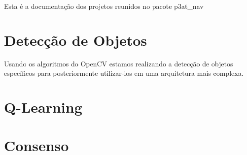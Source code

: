 \documentclass[a4paper, 12pt]{article}
\begin{document}
	Esta é a documentação dos projetos reunidos no pacote p3at\_nav

	\section{Detecção de Objetos}
		Usando os algoritmos do OpenCV estamos realizando a detecção de objetos
		específicos para posteriormente utilizar-los em uma arquitetura mais
		complexa.

\section{Q-Learning}

\newpage

\section{Consenso}

	


\newpage
\end{document}
